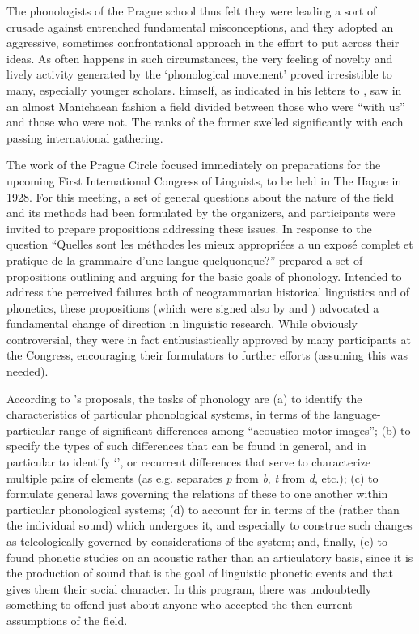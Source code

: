 The phonologists of the Prague school thus felt they were leading a
sort of crusade against entrenched fundamental misconceptions, and
they adopted an aggressive, sometimes confrontational approach in the
effort to put across their ideas. As often happens in such
circumstances, the very feeling of novelty and lively activity
generated by the `phonological movement' proved irresistible to many,
especially younger scholars. {\Trubetzkoy} himself, as indicated in his
letters to {\Jakobson}, saw in an almost Manichaean fashion a field
divided between those who were ``with us'' and those who were not. The
ranks of the former swelled significantly with each passing
international gathering. 

The work of the Prague Circle focused immediately on preparations for
the upcoming {First International Congress of Linguists}, to be held in
The Hague in 1928. For this meeting, a set of general questions about
the nature of the field and its methods had been formulated by the
organizers, and participants were invited to prepare propositions
addressing these issues. In response to the question ``Quelles sont les
méthodes les mieux appropriées a un exposé complet et pratique de la
grammaire d'une {langue} quelquonque?'' \citet{jakobson28:first.icl}
prepared a set of propositions outlining and arguing for the basic
goals of phonology. Intended to address the perceived failures both of
neogrammarian historical linguistics and of phonetics, these
propositions (which were signed also by {\Trubetzkoy} and {\Karcevskij})
advocated a fundamental {change} of direction in linguistic
research. While obviously controversial, they were in fact
enthusiastically approved by many participants at the Congress,
encouraging their formulators to further efforts (assuming this was
needed).

According to {\Jakobson}'s proposals, the tasks of phonology are (a) to
identify the characteristics of particular phonological systems, in
terms of the language-particular range of significant differences
among ``acoustico-motor images''; (b) to specify the types of such
differences that can be found in general, and in particular to
identify `', or recurrent differences that serve to
characterize multiple pairs of elements (as e.g.  separates
\emph{p} from \emph{b}, \emph{t} from \emph{d}, etc.); (c) to
formulate general laws governing the relations of these 
to one another within particular phonological systems; (d) to account
for  in terms of the  (rather than
the individual sound) which undergoes it, and especially to construe
such changes as teleologically governed by considerations of the
system; and, finally, (e) to found phonetic studies on an acoustic
rather than an articulatory basis, since it is the production of sound
that is the goal of linguistic phonetic events and that gives them
their social character. In this program, there was undoubtedly
something to offend just about anyone who accepted the then-current
assumptions of the field.

